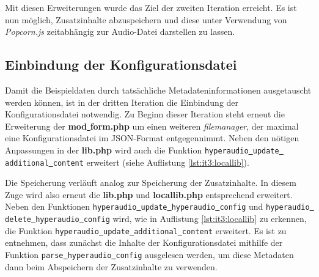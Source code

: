 Mit diesen Erweiterungen wurde das Ziel der zweiten Iteration erreicht. Es ist nun möglich, Zusatzinhalte abzuspeichern und diese unter Verwendung von \textit{Popcorn.js} zeitabhängig zur Audio-Datei darstellen zu lassen.

\subsection{Einbindung der Konfigurationsdatei}
Damit die Beispieldaten durch tatsächliche Metadateninformationen ausgetauscht werden können, ist in der dritten Iteration die Einbindung der Konfigurationsdatei notwendig. Zu Beginn dieser Iteration steht erneut die Erweiterung der \textbf{mod\underline{{ }}form.php} um einen weiteren \textit{filemanager}, der maximal eine Konfigurationsdatei im JSON-Format entgegennimmt. Neben den nötigen Anpassungen in der \textbf{lib.php} wird auch die Funktion \texttt{hyperaudio\underline{{ }}update\underline{{ }}additional\underline{{ }}content} erweitert (siehe Auflistung \ref{lst:it3:locallib}).



Die Speicherung verläuft analog zur Speicherung der Zusatzinhalte. In diesem Zuge wird also erneut die \textbf{lib.php} und \textbf{locallib.php} entsprechend erweitert. Neben den Funktionen \texttt{hyperaudio\underline{{ }}update\underline{{ }}hyperaudio\underline{{ }}config} und \texttt{hyperaudio\underline{{ }}delete\underline{{ }}hyperaudio\underline{{ }}config} wird, wie in Auflistung \ref{lst:it3:locallib} zu erkennen, die Funktion \texttt{hyperaudio\underline{{ }}update\underline{{ }}additional\underline{{ }}content} erweitert. Es ist zu entnehmen, dass zunächst die Inhalte der Konfigurationsdatei mithilfe der Funktion \texttt{parse\underline{{ }}hyperaudio\underline{{ }}config} ausgelesen werden, um diese Metadaten dann beim Abspeichern der Zusatzinhalte zu verwenden.


